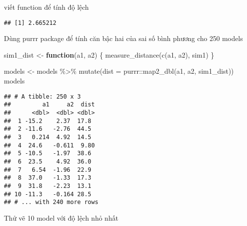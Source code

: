 \documentclass[
]{article}
\newenvironment{Shaded}{\begin{snugshade}}{\end{snugshade}}
\newcommand{\AttributeTok}[1]{\textcolor[rgb]{0.77,0.63,0.00}{#1}}
\newcommand{\ControlFlowTok}[1]{\textcolor[rgb]{0.13,0.29,0.53}{\textbf{#1}}}
\newcommand{\DecValTok}[1]{\textcolor[rgb]{0.00,0.00,0.81}{#1}}
\newcommand{\FloatTok}[1]{\textcolor[rgb]{0.00,0.00,0.81}{#1}}
\newcommand{\FunctionTok}[1]{\textcolor[rgb]{0.00,0.00,0.00}{#1}}
\newcommand{\NormalTok}[1]{#1}
\newcommand{\OtherTok}[1]{\textcolor[rgb]{0.56,0.35,0.01}{#1}}
\newcommand{\SpecialCharTok}[1]{\textcolor[rgb]{0.00,0.00,0.00}{#1}}
\begin{document}
viết function để tính độ lệch

\begin{Shaded}
\end{Shaded}

\begin{verbatim}
## [1] 2.665212
\end{verbatim}

Dùng purrr package để tính căn bậc hai của sai số bình phương cho 250
models

\begin{Shaded}
\begin{Highlighting}[]
\NormalTok{sim1\_dist }\OtherTok{\textless{}{-}} \ControlFlowTok{function}\NormalTok{(a1, a2) \{}
  \FunctionTok{measure\_distance}\NormalTok{(}\FunctionTok{c}\NormalTok{(a1, a2), sim1)}
\NormalTok{\}}

\NormalTok{models }\OtherTok{\textless{}{-}}\NormalTok{ models }\SpecialCharTok{\%\textgreater{}\%} 
  \FunctionTok{mutate}\NormalTok{(}\AttributeTok{dist =}\NormalTok{ purrr}\SpecialCharTok{::}\FunctionTok{map2\_dbl}\NormalTok{(a1, a2, sim1\_dist))}
\NormalTok{models}
\end{Highlighting}
\end{Shaded}

\begin{verbatim}
## # A tibble: 250 x 3
##         a1     a2  dist
##      <dbl>  <dbl> <dbl>
##  1 -15.2    2.37  17.8 
##  2 -11.6   -2.76  44.5 
##  3   0.214  4.92  14.5 
##  4  24.6   -0.611  9.80
##  5 -10.5   -1.97  38.6 
##  6  23.5    4.92  36.0 
##  7   6.54  -1.96  22.9 
##  8  37.0   -1.33  17.3 
##  9  31.8   -2.23  13.1 
## 10 -11.3   -0.164 28.5 
## # ... with 240 more rows
\end{verbatim}

Thử vẽ 10 model với độ lệch nhỏ nhất
\end{document}
